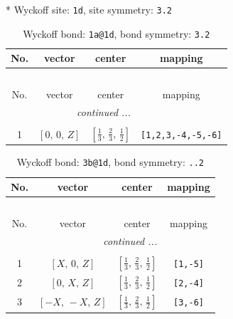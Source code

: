 \documentclass[fleqn,8pt]{jsarticle}
\begin{document}
* Wyckoff site: {\tt 1d}, site symmetry: {\tt 3.2}
\renewcommand{\arraystretch}{1.2}
\begin{longtable}{cccc}
\caption{Wyckoff bond: {\tt 1a@1d}, bond symmetry: {\tt 3.2}}
 \\
 \hline \hline
No. & vector & center & mapping \\ \hline \endfirsthead

\multicolumn{3}{l}{\tablename\ \thetable{}} \\
 \hline \hline
No. & vector & center & mapping \\ \hline \endhead

 \hline \hline
\multicolumn{3}{r}{\footnotesize\it continued ...} \\ \endfoot

 \hline \hline
\multicolumn{3}{r}{} \\ \endlastfoot

1 & $\left[ 0,\, 0,\, Z \right]$ & $\left[ \frac{1}{3},\, \frac{2}{3},\, \frac{1}{2} \right]$ & {\tt [1,2,3,-4,-5,-6]} \\
\end{longtable}
\renewcommand{\arraystretch}{1.2}
\begin{longtable}{cccc}
\caption{Wyckoff bond: {\tt 3b@1d}, bond symmetry: {\tt ..2}}
 \\
 \hline \hline
No. & vector & center & mapping \\ \hline \endfirsthead

\multicolumn{3}{l}{\tablename\ \thetable{}} \\
 \hline \hline
No. & vector & center & mapping \\ \hline \endhead

 \hline \hline
\multicolumn{3}{r}{\footnotesize\it continued ...} \\ \endfoot

 \hline \hline
\multicolumn{3}{r}{} \\ \endlastfoot

1 & $\left[ X,\, 0,\, Z \right]$ & $\left[ \frac{1}{3},\, \frac{2}{3},\, \frac{1}{2} \right]$ & {\tt [1,-5]} \\ \hline
2 & $\left[ 0,\, X,\, Z \right]$ & $\left[ \frac{1}{3},\, \frac{2}{3},\, \frac{1}{2} \right]$ & {\tt [2,-4]} \\ \hline
3 & $\left[ - X,\, - X,\, Z \right]$ & $\left[ \frac{1}{3},\, \frac{2}{3},\, \frac{1}{2} \right]$ & {\tt [3,-6]} \\
\end{longtable}
\renewcommand{\arraystretch}{1.2}
\end{document}
